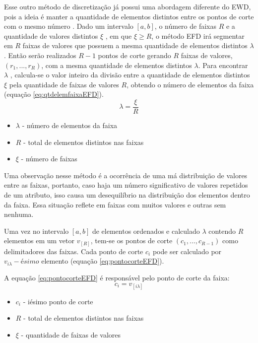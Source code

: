 Esse outro método de discretização já possui uma abordagem diferente do EWD, pois a ideia é manter a quantidade de elementos distintos entre os pontos de corte com o mesmo número \cite{Baron2016,Yang2002}. Dado um intervalo ${[a,b]}$, o número de faixas ${R}$ e a quantidade de valores distintos ${\xi}$ , em que ${\xi \geqslant R}$, o método EFD irá segmentar em ${R}$ faixas de valores que possuem a mesma quantidade de elementos distintos ${\lambda}$. Então serão realizados ${R-1}$ pontos de corte gerando ${R}$ faixas de valores, ${(r_1,...,r_R)}$, com a mesma quantidade de elementos distintos ${\lambda}$. Para encontrar ${\lambda}$ , calcula-se o valor inteiro da divisão entre a quantidade de elementos distintos ${\xi}$ pela quantidade de faixas de valores ${R}$, obtendo o número de elementos da faixa (equação \ref{eq:qtdelemfaixaEFD}). 
\begin{equation}
\lambda = \frac{\xi}{R}
 \label{eq:qtdelemfaixaEFD}
\end{equation}
\begin{itemize}[noitemsep]
 \item ${\lambda}$ - número de elementos da faixa
 \item ${R}$ - total de elementos distintos nas faixas
 \item ${\xi}$ - número de faixas
\end{itemize}


Uma observação nesse método é a ocorrência de uma má distribuição de valores entre as faixas, portanto, caso haja um número significativo de valores repetidos de um atributo, isso causa um desequilíbrio na distribuição dos elementos dentro da faixa. Essa situação reflete em faixas com muitos valores e outras sem nenhuma. 

Uma vez no intervalo ${[a,b]}$ de elementos ordenados e calculado ${\lambda}$ contendo ${R}$ elementos em um vetor ${v_{[R]}}$, tem-se os pontos de corte ${(c_1,...,c_{R-1})}$ como  delimitadores das faixas. Cada ponto de corte ${c_i}$ pode ser calculado por ${v_{i\lambda}-ésimo}$ elemento (equação \ref{eq:pontocorteEFD}).

A equação \ref{eq:pontocorteEFD} é responsável pelo ponto de corte da faixa:
\begin{equation}
c_i = v_{[i\lambda]}
 \label{eq:pontocorteEFD}
\end{equation}
\begin{itemize}[noitemsep]
 \item ${c_i}$ - iésimo ponto de corte
 \item ${R}$ - total de elementos distintos nas faixas
 \item ${\xi}$ - quantidade de faixas de valores
\end{itemize}

